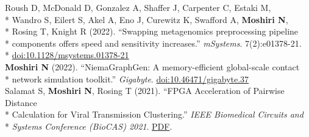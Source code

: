 \documentclass[margin,line]{res}
\begin{document}
\begin{resume}
\hspace*{9mm} Roush D, McDonald D, Gonzalez A, Shaffer J, Carpenter C, Estaki M,\\*
\hspace*{9mm} Wandro S, Eilert S, Akel A, Eno J, Curewitz K, Swafford A, \textbf{Moshiri N},\\*
\hspace*{9mm} Rosing T, Knight R (2022). ``Swapping metagenomics preprocessing pipeline\\*
\hspace*{9mm} components offers speed and sensitivity increases.'' \textit{mSystems}. 7(2):e01378-21.\\*\vspace{2mm}
\hspace*{8mm} \href{https://doi.org/10.1128/msystems.01378-21}{doi:10.1128/msystems.01378-21}\\
\hspace*{4mm} \textbf{Moshiri N} (2022). ``NiemaGraphGen: A memory-efficient global-scale contact\\*\vspace{2mm}
\hspace*{8mm} network simulation toolkit.'' \textit{Gigabyte}. \href{https://doi.org/10.46471/gigabyte.37}{doi:10.46471/gigabyte.37}\\
\hspace*{4mm} Salamat S, \textbf{Moshiri N}, Rosing T (2021). ``FPGA Acceleration of Pairwise Distance\\*
\hspace*{9mm} Calculation for Viral Transmission Clustering.'' \textit{IEEE Biomedical Circuits and}\\*\vspace{2mm}
\hspace*{8mm} \textit{Systems Conference (BioCAS) 2021}. \href{https://par.nsf.gov/servlets/purl/10323850}{PDF}.\\

\end{resume}
\end{document}

